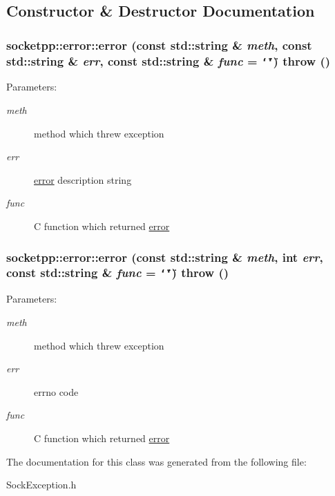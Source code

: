 \subsection{Constructor \& Destructor Documentation}
\hypertarget{classsocketpp_1_1error_614fef9f326d7bb212771eb20a046290}{
\subsubsection[{error}]{\setlength{\rightskip}{0pt plus 5cm}socketpp::error::error (const std::string \& {\em meth}, \/  const std::string \& {\em err}, \/  const std::string \& {\em func} = {\tt \char`\"{}\char`\"{}})  throw ()}}
\label{classsocketpp_1_1error_614fef9f326d7bb212771eb20a046290}


\begin{Desc}
\item[Parameters:]
\begin{description}
\item[{\em meth}]method which threw exception \item[{\em err}]\hyperlink{classsocketpp_1_1error}{error} description string \item[{\em func}]C function which returned \hyperlink{classsocketpp_1_1error}{error} \end{description}
\end{Desc}
\hypertarget{classsocketpp_1_1error_1287e8ec1ff5f7b18d91ea65c2505ae8}{
\subsubsection[{error}]{\setlength{\rightskip}{0pt plus 5cm}socketpp::error::error (const std::string \& {\em meth}, \/  int {\em err}, \/  const std::string \& {\em func} = {\tt \char`\"{}\char`\"{}})  throw ()}}
\label{classsocketpp_1_1error_1287e8ec1ff5f7b18d91ea65c2505ae8}


\begin{Desc}
\item[Parameters:]
\begin{description}
\item[{\em meth}]method which threw exception \item[{\em err}]errno code \item[{\em func}]C function which returned \hyperlink{classsocketpp_1_1error}{error} \end{description}
\end{Desc}


The documentation for this class was generated from the following file:\begin{CompactItemize}
\item 
SockException.h\end{CompactItemize}
